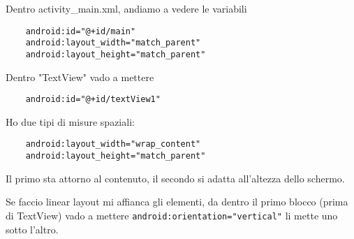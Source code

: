 \par Dentro activity\_main.xml, andiamo a vedere le variabili
\begin{verbatim}
    android:id="@+id/main"
    android:layout_width="match_parent"
    android:layout_height="match_parent"
\end{verbatim}
\par Dentro "TextView" vado a mettere
\begin{verbatim}
    android:id="@+id/textView1"
\end{verbatim}
\par Ho due tipi di misure spaziali:
\begin{verbatim}
    android:layout_width="wrap_content"
    android:layout_height="match_parent"
\end{verbatim}
\par Il primo sta attorno al contenuto, il secondo si adatta all'altezza dello schermo.
\par Se faccio linear layout mi affianca gli elementi, da dentro il primo blocco (prima di TextView) vado a mettere \texttt{android:orientation="vertical"} li mette uno sotto l'altro.